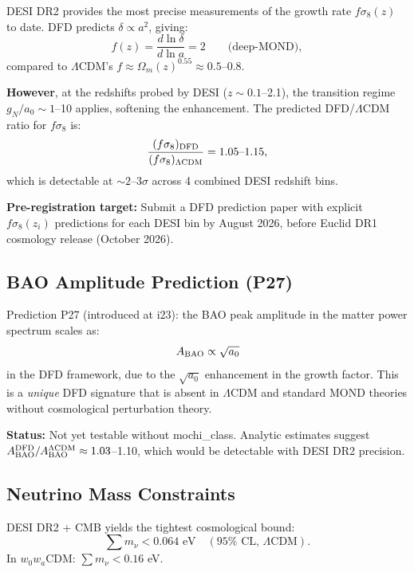 \documentclass[11pt]{article}
\newcommand{\LCDM}{$\Lambda$CDM}
\newcommand{\aM}{a_0}
\newcommand{\Om}{\Omega_m}
\begin{document}
DESI DR2 provides the most precise measurements of the growth rate
$f\sigma_8(z)$ to date. DFD predicts $\delta \propto a^2$, giving:
\begin{equation}
  f(z) = \frac{d\ln\delta}{d\ln a} = 2 \qquad \text{(deep-MOND)},
\end{equation}
compared to \LCDM's $f \approx \Om(z)^{0.55} \approx 0.5$--0.8.

\textbf{However}, at the redshifts probed by DESI ($z \sim 0.1$--2.1),
the transition regime $g_N/\aM \sim 1$--10 applies, softening the
enhancement. The predicted DFD/\LCDM{} ratio for $f\sigma_8$ is:
\begin{equation}
  \frac{(f\sigma_8)_{\rm DFD}}{(f\sigma_8)_{\Lambda\rm CDM}}
  = 1.05\text{--}1.15,
\end{equation}
which is detectable at $\sim 2$--$3\sigma$ across 4 combined DESI
redshift bins.

\textbf{Pre-registration target:} Submit a DFD prediction paper
with explicit $f\sigma_8(z_i)$ predictions for each DESI bin by
August 2026, before Euclid DR1 cosmology release (October 2026).

\subsection{BAO Amplitude Prediction (P27)}

Prediction P27 (introduced at i23): the BAO peak amplitude in the
matter power spectrum scales as:
\begin{equation}
  A_{\rm BAO} \propto \sqrt{\aM}
\end{equation}
in the DFD framework, due to the $\sqrt{\aM}$ enhancement in the
growth factor. This is a \emph{unique} DFD signature that is absent
in \LCDM{} and standard MOND theories without cosmological perturbation
theory.

\textbf{Status:} Not yet testable without mochi\_class. Analytic
estimates suggest $A_{\rm BAO}^{\rm DFD}/A_{\rm BAO}^{\Lambda\rm CDM}
\approx 1.03$--1.10, which would be detectable with DESI DR2 precision.

\subsection{Neutrino Mass Constraints}

DESI DR2 + CMB yields the tightest cosmological bound:
\begin{equation}
  \sum m_\nu < 0.064 \text{ eV} \quad (95\% \text{ CL, } \Lambda\text{CDM}).
\end{equation}
In $w_0w_a$CDM: $\sum m_\nu < 0.16$ eV.
\end{document}
